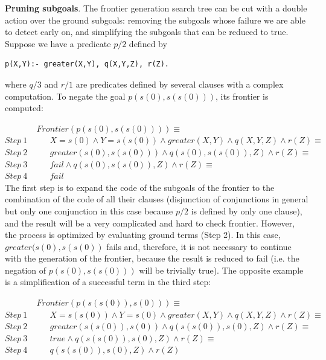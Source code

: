 \documentclass{tlp}
\begin{document}
\noindent
{\bf Pruning subgoals}. The frontier generation search tree can be
cut with a double action over the ground subgoals: removing the
subgoals whose failure we are able to detect early on, and simplifying the
subgoals that can be reduced to true. Suppose  we have a predicate $p/2$
defined by
{
\begin{verbatim}
p(X,Y):- greater(X,Y), q(X,Y,Z), r(Z).
\end{verbatim}
}\noindent
where $q/3$ and $r/1$ are predicates defined by several
clauses with a complex computation. To negate
the goal $p(s(0),s(s(0)))$, its frontier is computed:

$~~~~~~~~~~~~~~~~~Frontier(p(s(0),s(s(0)))) \equiv $ \\
$Step~ 1~~~~~~~~~~~~{ X=s(0) \wedge Y=s(s(0)) \wedge
  greater(X,Y) \wedge q(X,Y,Z) \wedge r(Z) } \equiv $ \\
$Step~ 2~~~~~~~~~~~~{ greater(s(0),s(s(0))) \wedge q(s(0),s(s(0)),Z) \wedge r(Z) } \equiv $ \\
$Step~ 3~~~~~~~~~~~~{ fail  \wedge q(s(0),s(s(0)),Z) \wedge r(Z) } \equiv $ \\
$Step~ 4~~~~~~~~~~~~fail $ \\

The first step is to expand the code of the subgoals of the frontier
to the combination of the code of all their clauses (disjunction of
conjunctions in general but only one conjunction in this case because
$p/2$ is defined by only one clause), and the result will be a very
complicated and hard to check frontier.  However, the process is
optimized by evaluating ground terms (Step 2). In this case,
$greater(s(0),s(s(0))$ fails and, therefore, it is not necessary to
continue with the generation of the frontier, because the result is
reduced to fail (i.e. the negation of $p (s(0), s(s(0)))$ will be
trivially true). The opposite example is a simplification of a
successful term in the third step:

$~~~~~~~~~~~~~~~~~Frontier(p(s(s(0)),s(0))) \equiv $\\
$Step~ 1~~~~~~~~~~~~{ X=s(s(0)) \wedge Y=s(0) \wedge greater(X,Y) \wedge q(X,Y,Z) \wedge
  r(Z) } \equiv $ \\
$Step~ 2~~~~~~~~~~~~{ greater(s(s(0)),s(0)) \wedge q(s(s(0)),s(0),Z) \wedge r(Z) } \equiv
$ \\
$Step~ 3~~~~~~~~~~~~{ true \wedge q(s(s(0)),s(0),Z) \wedge r(Z) } \equiv $ \\
$Step~ 4~~~~~~~~~~~~{ q(s(s(0)),s(0),Z) \wedge r(Z) } $ \\
\end{document}
